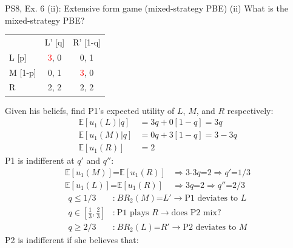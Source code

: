 \begin{frame}{PS8, Ex. 6 (ii): Extensive form game (mixed-strategy PBE)}
    (ii) What is the mixed-strategy PBE? \vspace{-8pt}
    \begin{multicols}{2}
      \begin{table}
        \begin{tabular}{l|c|c|}
          \multicolumn{1}{c}{} & \multicolumn{1}{c}{L' [q]} & \multicolumn{1}{c}{R' [1-q]} \\\cline{2-3}
          L [p]   & \textcolor{red}{3}, 0 & 0, \color{blue}1 \\\cline{2-3}
          M [1-p] & 0, \color{blue}1 & \textcolor{red}{3}, 0 \\\cline{2-3}
          R       & 2, \color{blue}2 & 2, \color{blue}2 \\\cline{2-3}
        \end{tabular}
      \end{table} \vspace{-4pt}
      Given his beliefs, find P1's expected utility of $L$, $M$, and $R$ respectively: \vspace{-4pt}
      \begin{align*}
        \mathbb{E}[u_1(L)|q]&=3q+0[1-q]=3q\\
        \mathbb{E}[u_1(M)|q]&=0q+3[1-q]=3-3q\\
        \mathbb{E}[u_1(R)]&=2
      \end{align*}
      P1 is indifferent at $q'$ and $q''$: \vspace{-6pt}
      \begin{align*}
        \mathbb{E}[u_1(M)]\text{=}\mathbb{E}[u_1(R)]&\Rightarrow \text{3-3}q\text{=}2\Rightarrow q'\text{=}1/3\\
        \mathbb{E}[u_1(L)]\text{=}\mathbb{E}[u_1(R)]&\Rightarrow 3q\text{=}2\Rightarrow q''\text{=}2/3
      \end{align*} \vspace{-16pt}
      \begin{align*}
        q\leq1/3&\text{:}\ BR_2(M)\text{=}L'\rightarrow\text{P1 deviates to }L\\
        q\text{$\in$}{\textstyle\left[\frac{1}{3},\frac{2}{3}\right]}&\text{:}\ \text{P1 plays }R\rightarrow\text{does P2 mix?}\\
        q\geq2/3&\text{:}\ BR_2(L)\text{=}R'\rightarrow\text{P2 deviates to }M
      \end{align*}
      P2 is indifferent if she believes that: \vspace{-6pt}

\end{multicols}
\end{frame}
